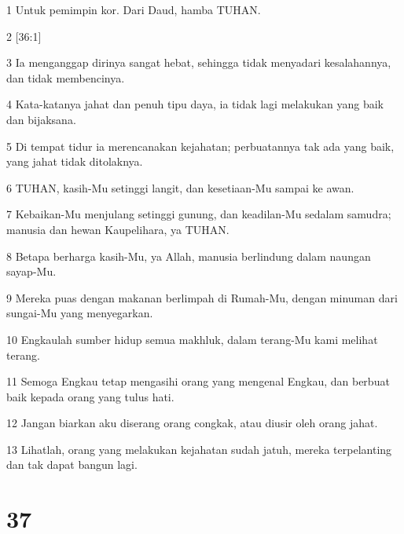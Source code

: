 \par 1 Untuk pemimpin kor. Dari Daud, hamba TUHAN.
\par 2 [36:1]
\par 3 Ia menganggap dirinya sangat hebat, sehingga tidak menyadari kesalahannya, dan tidak membencinya.
\par 4 Kata-katanya jahat dan penuh tipu daya, ia tidak lagi melakukan yang baik dan bijaksana.
\par 5 Di tempat tidur ia merencanakan kejahatan; perbuatannya tak ada yang baik, yang jahat tidak ditolaknya.
\par 6 TUHAN, kasih-Mu setinggi langit, dan kesetiaan-Mu sampai ke awan.
\par 7 Kebaikan-Mu menjulang setinggi gunung, dan keadilan-Mu sedalam samudra; manusia dan hewan Kaupelihara, ya TUHAN.
\par 8 Betapa berharga kasih-Mu, ya Allah, manusia berlindung dalam naungan sayap-Mu.
\par 9 Mereka puas dengan makanan berlimpah di Rumah-Mu, dengan minuman dari sungai-Mu yang menyegarkan.
\par 10 Engkaulah sumber hidup semua makhluk, dalam terang-Mu kami melihat terang.
\par 11 Semoga Engkau tetap mengasihi orang yang mengenal Engkau, dan berbuat baik kepada orang yang tulus hati.
\par 12 Jangan biarkan aku diserang orang congkak, atau diusir oleh orang jahat.
\par 13 Lihatlah, orang yang melakukan kejahatan sudah jatuh, mereka terpelanting dan tak dapat bangun lagi.

\chapter{37}

